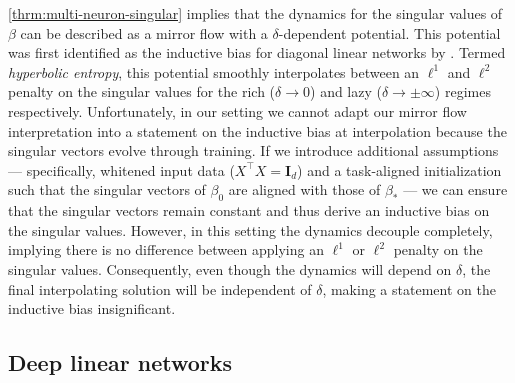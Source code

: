 \documentclass{article}
\theoremstyle{plain}
\theoremstyle{definition}
\theoremstyle{remark}
\begin{document}
\cref{thrm:multi-neuron-singular} implies that the dynamics for the singular values of $\beta$ can be described as a mirror flow with a $\delta$-dependent potential.
%
This potential was first identified as the inductive bias for diagonal linear networks by \citet{woodworth2020kernel}.
%
Termed \emph{hyperbolic entropy}, this potential smoothly interpolates between an $\ell^1$ and $\ell^2$ penalty on the singular values for the rich ($\delta \to 0$) and lazy ($\delta \to \pm \infty$) regimes respectively.
%
Unfortunately, in our setting we cannot adapt our mirror flow interpretation into a statement on the inductive bias at interpolation because the singular vectors evolve through training.
%
If we introduce additional assumptions — specifically, whitened input data (\( X^\intercal X = \mathbf{I}_d \)) and a task-aligned initialization such that the singular vectors of \( \beta_0 \) are aligned with those of \( \beta_* \) — we can ensure that the singular vectors remain constant and thus derive an inductive bias on the singular values.
%
However, in this setting the dynamics decouple completely, implying there is no difference between applying an \( \ell^1 \) or \( \ell^2 \) penalty on the singular values.
%
Consequently, even though the dynamics will depend on $\delta$, the final interpolating solution will be independent of $\delta$, making a statement on the inductive bias insignificant.




\subsection{Deep linear networks}
\label{app:wide-deep-linear-network-deep}
\end{document}
